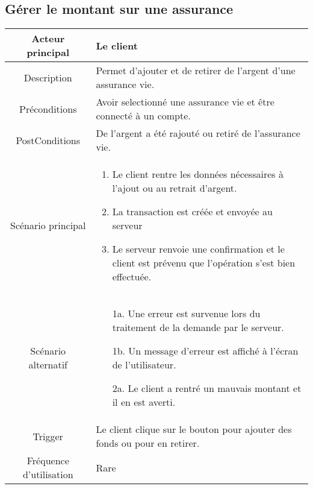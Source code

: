 \documentclass[]{article}
\begin{document}
\subsection{Gérer le montant sur une assurance}
\begin{table}[h]
    \begin{tabular}{|c|p{10cm}|}
       \hline
       Acteur principal&Le client\\
       \hline
       Description&Permet d'ajouter et de retirer de l'argent d'une assurance vie.\\
       \hline
       Préconditions&Avoir selectionné une assurance vie et être connecté à un compte.\\
       \hline
       PostConditions&De l'argent a été rajouté ou retiré de l'assurance vie.\\
       \hline
       Scénario principal& 
             \begin{enumerate}
                \item Le client rentre les données nécessaires à l'ajout ou au retrait d'argent.
                \item La transaction est créée et envoyée au serveur
                \item Le serveur renvoie une confirmation et le client est prévenu que l'opération s'est bien effectuée.
             \end{enumerate}     \\
       \hline
       Scénario alternatif&            
       \begin{itemize}
        \item[1a.] Une erreur est survenue lors du traitement de la demande par le serveur.
        \item[1b.] Un message d'erreur est affiché à l'écran de l'utilisateur. 
        \item[2a.] Le client a rentré un mauvais montant et il en est averti.
    \end{itemize}\\
       \hline
       Trigger&Le client clique sur le bouton pour ajouter des fonds ou pour en retirer.\\
       \hline
       Fréquence d'utilisation&Rare\\
       \hline
    \end{tabular}
 \end{table}

\newpage

\end{document}
